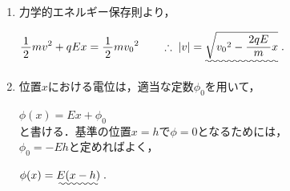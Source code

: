 \documentclass[../../../uem_phy_std_a.tex]{subfiles}
\begin{document}
    \begin{enumerate}
        \item 力学的エネルギー保存則より，

            \myspaceb%
            $\displaystyle%
                \myfraca{1}{2}mv^2 + qEx = \myfraca{1}{2}m{v_0}^2%
                \qquad \therefore \; |v|= \uwave{\sqrt{{v_0}^2 - \myfracd{2qE}{m}x}} \;.
            $            
        \item 位置$x$における電位は，適当な定数$\phi_0$を用いて，
            
            \myspaceb%
            $\displaystyle%
                \phi(x) = Ex + \phi_0
            $\\            
            と書ける．基準の位置$x=h$で$\phi=0$となるためには，\\
            $\phi_0 = -Eh$と定めればよく，
            
            \myspaceb%
            $\displaystyle%
                \phi(x) = \uwave{E(x - h)} \;.
            $
    \end{enumerate}
\end{document}
